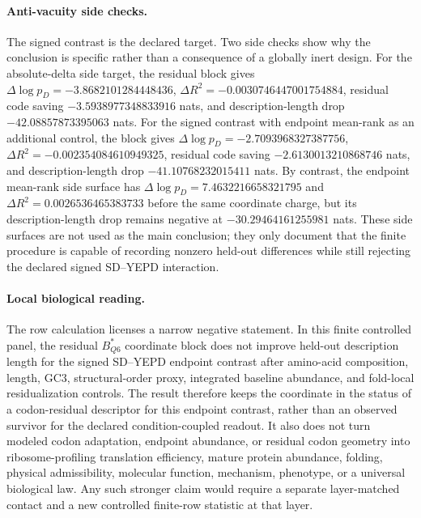 \paragraph{Anti-vacuity side checks.}
The signed contrast is the declared target.  Two side checks show why the conclusion is specific rather than a consequence of a globally inert design.  For the absolute-delta side target, the residual block gives $\Delta\log p_D=-3.8682101284448436$, $\Delta R^2=-0.0030746447001754884$, residual code saving $-3.5938977348833916$ nats, and description-length drop $-42.08857873395063$ nats.  For the signed contrast with endpoint mean-rank as an additional control, the block gives $\Delta\log p_D=-2.7093968327387756$, $\Delta R^2=-0.002354084610949325$, residual code saving $-2.6130013210868746$ nats, and description-length drop $-41.10768232015411$ nats.  By contrast, the endpoint mean-rank side surface has $\Delta\log p_D=7.4632216658321795$ and $\Delta R^2=0.0026536465383733$ before the same coordinate charge, but its description-length drop remains negative at $-30.29464161255981$ nats.  These side surfaces are not used as the main conclusion; they only document that the finite procedure is capable of recording nonzero held-out differences while still rejecting the declared signed SD--YEPD interaction.

\paragraph{Local biological reading.}
The row calculation licenses a narrow negative statement.  In this finite controlled panel, the residual $B^*_{Q6}$ coordinate block does not improve held-out description length for the signed SD--YEPD endpoint contrast after amino-acid composition, length, GC3, structural-order proxy, integrated baseline abundance, and fold-local residualization controls.  The result therefore keeps the coordinate in the status of a codon-residual descriptor for this endpoint contrast, rather than an observed survivor for the declared condition-coupled readout.  It also does not turn modeled codon adaptation, endpoint abundance, or residual codon geometry into ribosome-profiling translation efficiency, mature protein abundance, folding, physical admissibility, molecular function, mechanism, phenotype, or a universal biological law.  Any such stronger claim would require a separate layer-matched contact and a new controlled finite-row statistic at that layer.